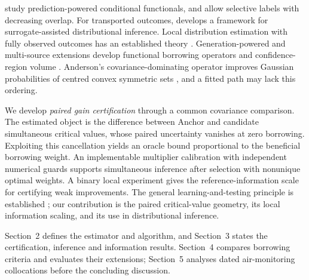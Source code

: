 \citet{SuiEtAl2026} study prediction-powered conditional functionals, and \citet{TestaEtAl2025} allow selective labels with decreasing overlap.
For transported outcomes, \citet{Wang2026} develops a framework for surrogate-assisted distributional inference.
Local distribution estimation with fully observed outcomes has an established theory \citep{CattaneoJanssonMa2024}.
Generation-powered and multi-source extensions develop functional borrowing operators and confidence-region volume \citep{zhang2026generation,li2026multisource}.
Anderson's covariance-dominating operator improves Gaussian probabilities of centred convex symmetric sets \citep{Anderson1955}, and a fitted path may lack this ordering.

We develop \emph{paired gain certification} through a common covariance comparison.
The estimated object is the difference between Anchor and candidate simultaneous critical values, whose paired uncertainty vanishes at zero borrowing.
Exploiting this cancellation yields an oracle bound proportional to the beneficial borrowing weight.
An implementable multiplier calibration with independent numerical guards supports simultaneous inference after selection with nonunique optimal weights.
A binary local experiment gives the reference-information scale for certifying weak improvements.
The general learning-and-testing principle is established \citep{angelopoulos2021learn}; our contribution is the paired critical-value geometry, its local information scaling, and its use in distributional inference.

Section~2 defines the estimator and algorithm, and Section~3 states the certification, inference and information results.
Section~4 compares borrowing criteria and evaluates their extensions; Section~5 analyses dated air-monitoring collocations before the concluding discussion.
